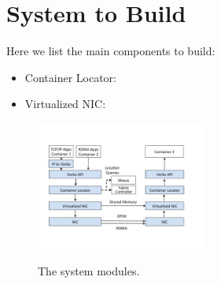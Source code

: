 \section{System to Build} \label{sec:promise}

Here we list the main components to build: 

\begin{itemize}
  \item Container Locator:
  \item Virtualized NIC:
\end{itemize}

     \begin{figure}[ht]
     \centering 
     \includegraphics[width=0.5\textwidth]{figures/system/system_modules.pdf}      
     \label{fig:system_modules}
     \caption{The system modules.} 
     \end{figure}